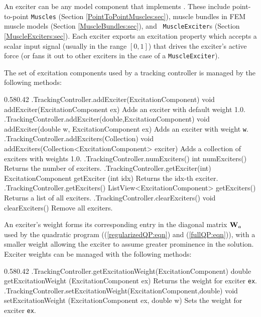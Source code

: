 An exciter can be any model component that implements
. These include
point-to-point {\tt Muscles} (Section \ref{PointToPointMuscles:sec}), muscle
bundles in FEM muscle models (Section \ref{MuscleBundles:sec}), and {\tt
MuscleExciter}s (Section \ref{MuscleExciters:sec}). Each exciter exports an
{\sf excitation} property which accepts a scalar input signal (usually in the
range $[0,1]$) that drives the exciter's active force (or fans it out to other
exciters in the case of a {\tt MuscleExciter}).

The set of excitation components used by a tracking controller is managed by
the following methods:

%
\begin{methodtable}{0.58}{0.42}
\midline
%
\methodentry
{\inverse.TrackingController.addExciter(ExcitationComponent)}%
{void addExciter(ExcitationComponent ex)}%
{Adds an exciter with default weight 1.0.}%
%
\methodentry
{\inverse.TrackingController.addExciter(double,ExcitationComponent)}%
{void addExciter(double w, ExcitationComponent ex)}%
{Adds an exciter with weight {\tt w}.}%
%
\methodentry
{\inverse.TrackingController.addExciters(Collection)}%
{void addExciters(Collection<ExcitationComponent> exciter)}%
{Adds a collection of exciters with weights 1.0.}%
%
\methodentry
{\inverse.TrackingController.numExciters()}%
{int numExciters()}%
{Returns the number of exciters.}%
%
\methodentry
{\inverse.TrackingController.getExciter(int)}%
{ExcitationComponent getExciter (int idx)}%
{Returns the idx-th exciter.}%
%
\methodentry
{\inverse.TrackingController.getExciters()}%
{ListView<ExcitationComponent> getExciters()}%
{Returns a list of all exciters.}%
%
\methodentry
{\inverse.TrackingController.clearExciters()}%
{void clearExciters()}%
{Remove all exciters.}%
%
\midline
\end{methodtable}
%

An exciter's weight forms its corresponding entry in the diagonal matrix ${\bf W}_a$
used by the quadratic program ((\ref{regularizedQP:eqn}) and
(\ref{fullQP:eqn})), with a smaller weight allowing the exciter to assume
greater prominence in the solution. Exciter weights can be managed with the
following methods:
%
\begin{methodtable}{0.58}{0.42}
\midline
%
\methodentry
{\inverse.TrackingController.getExcitationWeight(ExcitationComponent)}%
{double getExcitationWeight (ExcitationComponent ex)}%
{Returns the weight for exciter {\tt ex}.}%
%
\methodentry
{\inverse.TrackingController.setExcitationWeight(ExcitationComponent,double)}%
{void setExcitationWeight (ExcitationComponent ex, double w)}%
{Sets the weight for exciter {\tt ex}.}%
%
\midline
\end{methodtable}
%

